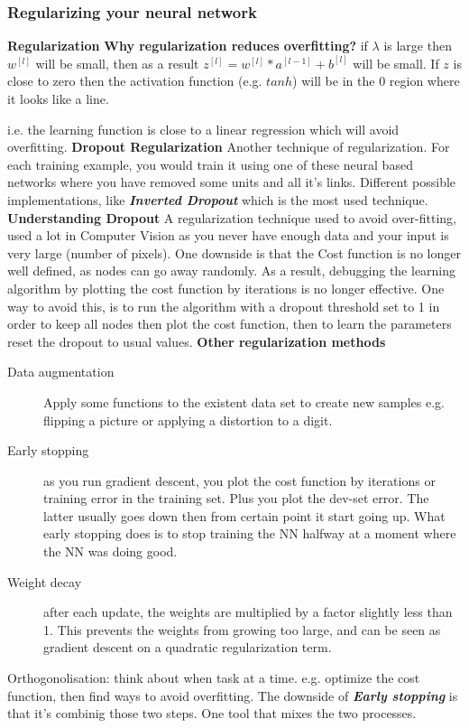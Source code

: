 \subsubsection*{Regularizing your neural network}
\textbf{Regularization}
\newline
\textbf{Why regularization reduces overfitting?}
if $\lambda$ is large then $w^{[l]}$ will be small, then as a result $z^{[l]} = w^{[l]} * a^{[l-1]} + b^{[l]}$ will be small. If $z$ is close to zero then the activation function (e.g. $tanh$) will be in the $0$ region where it looks like a line.

i.e. the learning function is close to a linear regression which will avoid overfitting.
\newline
\textbf{Dropout Regularization}
Another technique of regularization. For each training example, you would train it using one of these neural based networks where you have removed some units and all it's links.
Different possible implementations, like \textbf{\textit{Inverted Dropout}} which is the most used technique.
\newline
\textbf{Understanding Dropout}
A regularization technique used to avoid over-fitting, used a lot in Computer Vision as you never have enough data and your input is very large (number of pixels).
\newline
One downside is that the Cost function is no longer well defined, as nodes can go away randomly. As a result, debugging the learning algorithm by plotting the cost function by iterations is no longer effective. One way to avoid this, is to run the algorithm with a dropout threshold set to 1 in order to keep all nodes then plot the cost function, then to learn the parameters reset the dropout to usual values.
\newline
\textbf{Other regularization methods}
\begin{description}
    \item[Data augmentation] Apply some functions to the existent data set to create new samples e.g. flipping a picture or applying a distortion to a digit.
    \item[Early stopping] as you run gradient descent, you plot the cost function by iterations or training error in the training set. Plus you plot the dev-set error. The latter usually goes down then from certain point it start going up. What early stopping does is to stop training the NN halfway at a moment where the NN was doing good.
    \item[Weight decay] after each update, the weights are multiplied by a factor slightly less than 1. This prevents the weights from growing too large, and can be seen as gradient descent on a quadratic regularization term.
\end{description}
Orthogonolisation: think about when task at a time. e.g. optimize the cost function, then find ways to avoid overfitting.
The downside of \textbf{\textit{Early stopping}} is that it's combinig those two steps. One tool that mixes the two processes.

